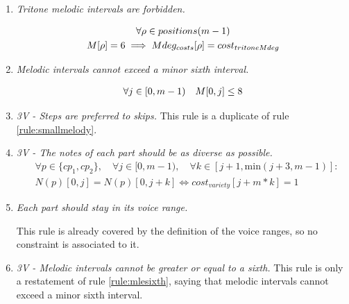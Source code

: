 \begin{enumerate}[wide, label=\bfseries 1.M\arabic*]
\item\label{rule:notritone}{\textit{Tritone melodic intervals are forbidden.} }

\begin{equation}
    \begin{gathered}
        \forall \rho \in positions(m-1)\\
        M[\rho] = 6 \implies Mdeg_{costs}[\rho] = cost_{tritoneMdeg}\\
    \end{gathered}
\end{equation}

\item\label{rule:mlesixth}{\textit{Melodic intervals cannot exceed a minor sixth interval.}}

\begin{equation}
    \begin{gathered}
        \forall j \in [0, m-1)\quad
        M[0, j] \leq 8
    \end{gathered}
\end{equation}

\item \textit{3V - Steps are preferred to skips.}
This rule is a duplicate of rule \ref{rule:smallmelody}.

\item  \textit{3V - The notes of each part should be as diverse as possible.}
    \begin{equation} \begin{aligned}
    &\forall p \in \{cp_1, cp_2\}, \quad \forall j \in [0, m-1), \quad \forall k \in [j+1, \text{min} (j+3, m-1)] :\\ 
    &N(p)[0, j] = N(p)[0, j+k]\iff cost_{variety}[j+m*k]= 1
    \end{aligned} \end{equation}

    \item  \textit{Each part should stay in its voice range.}

This rule is already covered by the definition of the voice ranges, so no constraint is associated to it.

    \item  \textit{3V - Melodic intervals cannot be greater or equal to a sixth.}
    This rule is only a restatement of rule \ref{rule:mlesixth}, saying that melodic intervals cannot exceed a minor sixth interval.
\end{enumerate}
    
